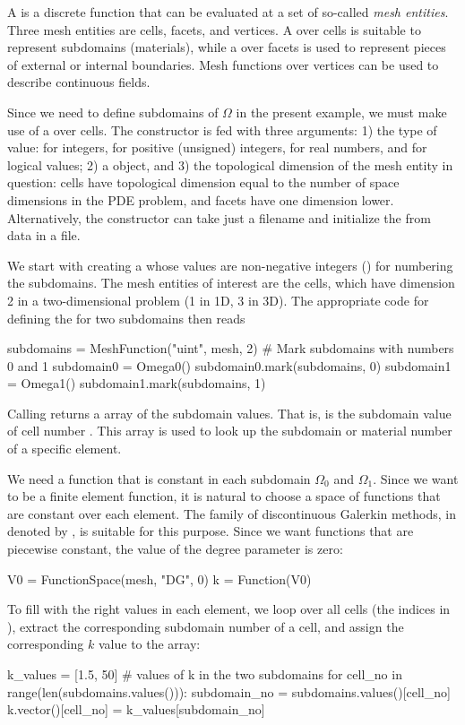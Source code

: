 A  is a discrete function that can be evaluated at a set
of so-called \emph{mesh entities}. Three mesh entities are
cells, facets, and vertices. A  over cells is suitable to
represent subdomains (materials), while a  over
facets is used to represent pieces of external or internal boundaries.
Mesh functions over vertices can be used to describe continuous fields.

Since we need to define subdomains of $\Omega$
in the present example, we must make use
of a  over cells. The
 constructor is fed with three arguments: 1) the type
of value:  for integers,  for positive
(unsigned) integers,  for real numbers, and
 for logical values; 2) a  object, and 3)
the topological dimension of the mesh entity in question: cells
have topological dimension equal to the number of space dimensions in
the PDE problem, and facets have one dimension lower.
Alternatively, the constructor can take just a filename
and initialize the  from data in a file.

We start with creating a  whose
values are non-negative integers ()
for numbering the subdomains.
The mesh entities of interest are the cells, which have dimension 2
in a two-dimensional problem (1 in 1D, 3 in 3D). The appropriate code for
defining the  for two subdomains then reads
\begin{python}
subdomains = MeshFunction("uint", mesh, 2)
# Mark subdomains with numbers 0 and 1
subdomain0 = Omega0()
subdomain0.mark(subdomains, 0)
subdomain1 = Omega1()
subdomain1.mark(subdomains, 1)
\end{python}

Calling  returns a  array of the
subdomain values. That is,  is
the subdomain value of cell number . This array is used to
look up the subdomain or material number of a specific element.

We need a function  that is constant in
each subdomain $\Omega_0$ and $\Omega_1$. Since we want 
to be a finite element function, it is natural to choose
a space of functions that are constant over each element.
The family of discontinuous Galerkin methods, in \fenics{}
denoted by , is suitable for this purpose. Since we
want functions that are piecewise constant, the value of
the degree parameter is zero:
\begin{python}
V0 = FunctionSpace(mesh, "DG", 0)
k  = Function(V0)
\end{python}
To fill  with the right values in each element, we loop over
all cells (the indices in ),
extract the corresponding subdomain number of a cell,
and assign the corresponding $k$ value to the  array:
\begin{python}
k_values = [1.5, 50]  # values of k in the two subdomains
for cell_no in range(len(subdomains.values())):
    subdomain_no = subdomains.values()[cell_no]
    k.vector()[cell_no] = k_values[subdomain_no]
\end{python}

